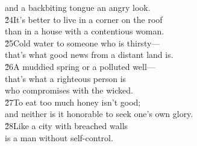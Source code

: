 \begin{poetry}
\poemll    and a backbiting tongue an angry look. \\
\poeml \v{24}It's better to live in a corner on the roof \\
\poemll    than in a house with a contentious woman. \\
\poeml \v{25}Cold water to someone who is thirsty--- \\
\poemll    that's what good news from a distant land is. \\
\poeml \v{26}A muddied spring or a polluted well--- \\
\poemll    that's what a righteous person is \\
\poemlll       who compromises with the wicked. \\
\poeml \v{27}To eat too much honey isn't good; \\
\poemll    and neither is it honorable to seek one's own glory. \\
\poeml \v{28}Like a city with breached walls \\
\poemll    is a man without self-control.
\end{poetry}

